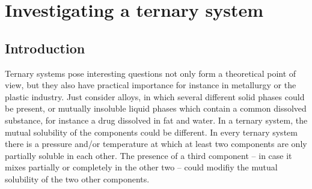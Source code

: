 \fancyhead[LO,RE]{\thesection}
\fancyfoot[LE,RO]{\thepage}

\section{Investigating a ternary system}
\subsection{Introduction}

Ternary systems pose interesting questions not only form a theoretical point of view, but they also have practical importance for instance in metallurgy or the plastic industry. Just consider alloys, in which several different solid phases could be present, or mutually insoluble liquid phases which contain a common dissolved substance, for instance a drug dissolved in fat and water. In a ternary system, the mutual solubility of the components could be different. In every ternary system there is a pressure and/or temperature at which at least two components are only partially soluble in each other. The presence of a third component -- in case it mixes partially or completely in the other two -- could modifiy the mutual solubility of the two other components.

